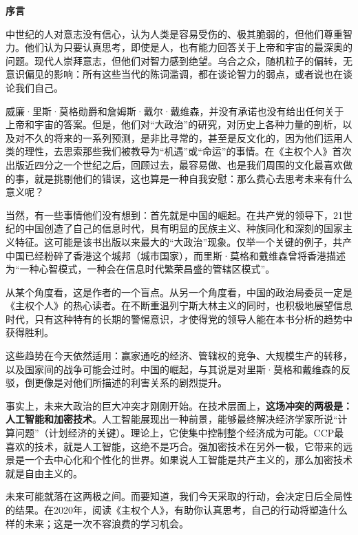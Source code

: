 \begin{center}
    \Huge\textbf{序言}
\end{center}

中世纪的人对意志没有信心，认为人类是容易受伤的、极其脆弱的，但他们尊重智力。他们认为只要认真思考，即使是人，也有能力回答关于上帝和宇宙的最深奥的问题。现代人崇拜意志，但他们对智力感到绝望。乌合之众，随机粒子的偏转，无意识偏见的影响：所有这些当代的陈词滥调，都在谈论智力的弱点，或者说也在谈论我们自己。

威廉·里斯·莫格勋爵和詹姆斯·戴尔·戴维森，并没有承诺也没有给出任何关于上帝和宇宙的答案。但是，他们对“大政治”的研究，对历史上各种力量的剖析，以及对不久的将来的一系列预测，是非比寻常的，甚至是反文化的，因为他们运用人类的理性，去思索那些我们被教导为“机遇”或“命运”的事情。在《主权个人》首次出版近四分之一个世纪之后，回顾过去，最容易做、也是我们周围的文化最喜欢做的事，就是挑剔他们的错误，这也算是一种自我安慰：那么费心去思考未来有什么意义呢？

当然，有一些事情他们没有想到：首先就是中国的崛起。在共产党的领导下，21世纪的中国创造了自己的信息时代，具有明显的民族主义、种族同化和深刻的国家主义特征。这可能是该书出版以来最大的“大政治”现象。仅举一个关键的例子，共产中国已经粉碎了香港这个城邦（城市国家），而里斯·莫格和戴维森曾将香港描述为“一种心智模式，一种会在信息时代繁荣昌盛的管辖区模式”。

从某个角度看，这是作者的一个盲点。从另一个角度看，中国的政治局委员一定是《主权个人》的热心读者。在不断重温列宁斯大林主义的同时，也积极地展望信息时代，只有这种特有的长期的警惕意识，才使得党的领导人能在本书分析的趋势中获得胜利。

这些趋势在今天依然适用：赢家通吃的经济、管辖权的竞争、大规模生产的转移，以及国家间的战争可能会过时。中国的崛起，与其说是对里斯·莫格和戴维森的反驳，倒更像是对他们所描述的利害关系的剧烈提升。

事实上，未来大政治的巨大冲突才刚刚开始。在技术层面上，\textbf{这场冲突的两极是：人工智能和加密技术}。人工智能展现出一种前景，能够最终解决经济学家所说“计算问题”（计划经济的关键）。理论上，它使集中控制整个经济成为可能。CCP最喜欢的技术，就是人工智能，这绝不是巧合。强加密技术在另外一极，它带来的远景是一个去中心化和个性化的世界。如果说人工智能是共产主义的，那么加密技术就是自由主义的。

未来可能就落在这两极之间。而要知道，我们今天采取的行动，会决定日后全局性的结果。在2020年，阅读《主权个人》，有助你认真思考，自己的行动将塑造什么样的未来；这是一次不容浪费的学习机会。
\\

